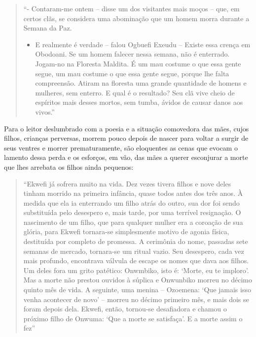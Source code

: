 \documentclass[
  letterpaper,
  DIV=11,
  numbers=noendperiod]{scrreprt}
\providecommand{\tightlist}{%
  \setlength{\itemsep}{0pt}\setlength{\parskip}{0pt}}\usepackage{longtable,booktabs,array}
\begin{document}
\begin{quote}
``- Contaram-me ontem -- disse um dos visitantes mais moços -- que, em
certos clãs, se considera uma abominação que um homem morra durante a
Semana da Paz.~

\begin{itemize}
\tightlist
\item
  E realmente é verdade -- falou Ogbuefi Exeudu -- Existe essa crença em
  Obodoani. Se um homem falecer nessa semana, não é enterrado. Jogam-no
  na Floresta Maldita. É um mau costume o que essa gente segue, um mau
  costume o que essa gente segue, porque lhe falta compreensão. Atiram
  na floresta uma grande quantidade de homens e mulheres, sem enterro. E
  qual é o resultado? Seu clã vive cheio de espíritos mais desses
  mortos, sem tumba, ávidos de causar danos aos vivos.''
\end{itemize}
\end{quote}

Para o leitor deslumbrado com a poesia e a situação comovedora das mães,
cujos filhos, crianças perversas, morrem pouco depois de nascer para
voltar a surgir de seus ventres e morrer prematuramente, são eloquentes
as cenas que evocam o lamento dessa perda e os esforços, em vão, das
mães a querer esconjurar a morte que lhes arrebata os filhos ainda
pequenos:

\begin{quote}
``Ekwefi já sofrera muito na vida. Dez vezes tivera filhos e nove deles
tinham morrido na primeira infância, quase todos antes dos três anos. À
medida que ela ia enterrando um filho atrás do outro, sua dor foi sendo
substituída pelo desespero e, mais tarde, por uma terrível resignação. O
nascimento de um filho, que para qualquer mulher era a coroação de sua
glória, para Ekwefi tornara-se simplesmente motivo de agonia física,
destituída por completo de promessa. A cerimônia do nome, passadas sete
semanas de mercado, tornara-se um ritual vazio. Seu desespero, cada vez
mais profundo, encontrava válvula de escape os nomes que dava aos
filhos. Um deles fora um grito patético: Onwmbiko, isto é: `Morte, eu te
imploro'. Mas a morte não prestou ouvidos à súplica e Onwunbiko morreu
no décimo quinto mês de vida. A seguinte, uma menina -- Ozoemena: `Que
jamais isso venha acontecer de novo' -- morreu no décimo primeiro mês, e
mais dois se foram depois dela. Ekwefi, então, tornou-se desafiadora e
chamou o próximo filho de Onwuma: `Que a morte se satisfaça'. E a morte
assim o fez''
\end{quote}
\end{document}
